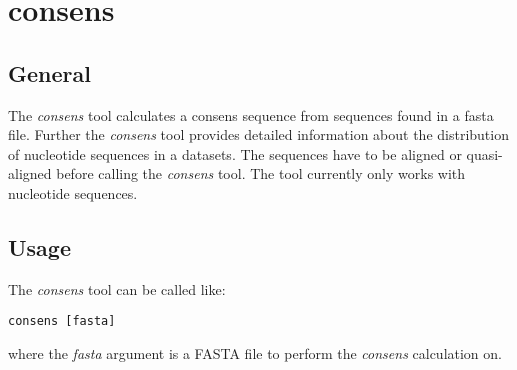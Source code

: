 \section{consens} \label{sec-consens}

\subsection{General}

The \emph{consens} tool calculates a consens sequence from sequences found in
a fasta file. Further the \emph{consens} tool provides detailed information
about the distribution of nucleotide sequences in a datasets.
The sequences have to be aligned or quasi-aligned before calling the
\emph{consens} tool. The tool currently only works with nucleotide
sequences.

\subsection{Usage}

The \emph{consens} tool can be called like:
\begin{lstlisting}
consens [fasta]
\end{lstlisting}
where the \emph{fasta} argument is a FASTA file to perform the
\emph{consens} calculation on.


